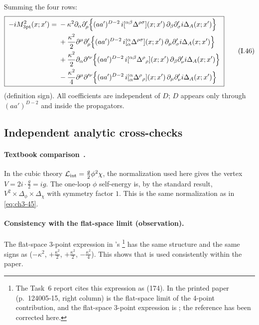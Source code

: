 \noindent Summing the four rows:
{%
\begin{equation}
\boxed{\;
\begin{aligned}
-iM^2_{\rm 3pt}(x;x')={}&-\kappa^2\partial_\alpha\partial'_\rho\Big\{(aa')^{D-2}\,i[{}^{\alpha\beta}\Delta^{\rho\sigma}](x;x')\,\partial_\beta\partial'_\sigma i\Delta_A(x;x')\Big\}\\
&+\frac{\kappa^2}2\partial^\mu\partial'_\rho\Big\{(aa')^{D-2}\,i[{}^\alpha_\alpha\Delta^{\rho\sigma}](x;x')\,\partial_\mu\partial'_\sigma i\Delta_A(x;x')\Big\}\\
&+\frac{\kappa^2}2\partial_\alpha\partial'^\nu\Big\{(aa')^{D-2}\,i[{}^{\alpha\beta}\Delta^\rho{}_\rho](x;x')\,\partial_\beta\partial'_\nu i\Delta_A(x;x')\Big\}\\
&-\frac{\kappa^2}4\partial^\mu\partial'^\nu\Big\{(aa')^{D-2}\,i[{}^\alpha_\alpha\Delta^\rho{}_\rho](x;x')\,\partial_\mu\partial'_\nu i\Delta_A(x;x')\Big\}
\end{aligned}\;}
\tag{I.46}\label{eq:ch3-46}
\end{equation}
}
(definition sign). All coefficients are independent of $D$; $D$ appears only through $(aa')^{D-2}$ and inside the propagators.

\subsection{Independent analytic cross-checks}

\paragraph{Textbook comparison \tA\,\tC.}
In the cubic theory $\mathcal L_{\rm int}=\tfrac g2\phi^2\chi$, the normalization used here gives the vertex $V=2i\cdot\tfrac g2=ig$. The one-loop $\phi$
self-energy is, by the standard result, $V^2\times\Delta_\phi\times\Delta_\chi$ with symmetry factor $1$. This is the same normalization as in \eqref{eq:ch3-45}.

\paragraph{Consistency with the flat-space limit (observation).}
The flat-space 3-point expression in \PI's \footnote{The Task~6 report cites this expression as (174). In the printed paper
(p.~124005-15, right column)  is the flat-space limit of the 4-point contribution, and the flat-space 3-point expression is ;
the reference has been corrected here.} has the same structure and the same signs as  ($-\kappa^2$, $+\tfrac{\kappa^2}2$, $+\tfrac{\kappa^2}2$,
$-\tfrac{\kappa^2}4$). This shows that  is used consistently within the paper.

